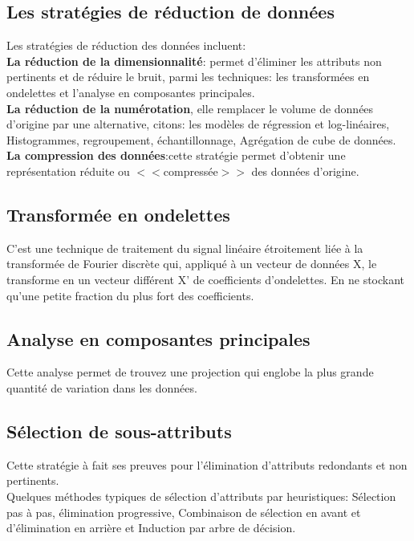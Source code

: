 \documentclass[12pt,a4paper,oneside]{book}
\begin{document}
\subsection{Les stratégies de réduction de données}
Les stratégies de réduction des données incluent:\\
 \textbf{La réduction de la dimensionnalité}: permet d'éliminer les attributs non pertinents et de réduire le bruit, parmi les techniques: les transformées en ondelettes et l'analyse en composantes principales.\\
 \textbf{La réduction de la numérotation}, elle remplacer le volume de données d'origine par une alternative, citons: les modèles de régression et log-linéaires, Histogrammes, regroupement, échantillonnage, Agrégation de cube de données.\\
 \textbf{La compression des données}:cette stratégie permet d'obtenir une représentation réduite ou $<<$compressée$>>$ des données d'origine.
 
 \subsection{Transformée en ondelettes}
C'est une technique de traitement du signal linéaire étroitement liée à la transformée de Fourier discrète qui, appliqué à un vecteur de données X, le transforme en un vecteur différent X' de
 coefficients d'ondelettes. En ne stockant qu'une petite fraction du plus fort des coefficients.
 
 \subsection{Analyse en composantes principales}
 Cette analyse permet de trouvez une projection qui englobe la plus grande quantité de variation dans les données.
 
 \subsection{Sélection de sous-attributs}
 Cette stratégie à fait ses preuves pour l'élimination d'attributs redondants et non pertinents.\\
 Quelques méthodes typiques de sélection d'attributs par heuristiques:
 Sélection pas à pas, élimination progressive, Combinaison de sélection en avant et d'élimination en arrière et Induction par arbre de décision.
 
\end{document}
